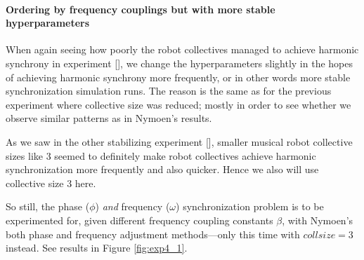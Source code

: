 		
		
		
		\paragraph{Ordering by frequency couplings but with more stable hyperparameters}
		
		When again seeing how poorly the robot collectives managed to achieve harmonic synchrony in experiment [], we change the hyperparameters slightly in the hopes of achieving harmonic synchrony more frequently, or in other words more stable synchronization simulation runs. The reason is the same as for the previous experiment where collective size was reduced; mostly in order to see whether we observe similar patterns as in Nymoen's results.
				
		As we saw in the other stabilizing experiment [], smaller musical robot collective sizes like 3 seemed to definitely make robot collectives achieve harmonic synchronization more frequently and also quicker. Hence we also will use collective size 3 here.
		
		So still, the phase ($\phi$) \textit{and} frequency ($\omega$) synchronization problem is to be experimented for, given different frequency coupling constants $\beta$, with Nymoen's both phase and frequency adjustment methods—only this time with $collsize=3$ instead. See results in Figure \ref{fig:exp4_1}.
		
		
